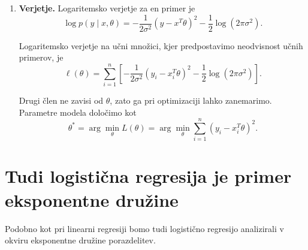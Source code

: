 \begin{enumerate}
\item \textbf{Verjetje.}
Logaritemsko verjetje za en primer je
\[
\log p(y \mid x, \theta) =
-\frac{1}{2\sigma^2}(y - x^T\theta)^2
- \frac{1}{2}\log(2\pi\sigma^2).
\]

Logaritemsko verjetje na učni množici, kjer predpostavimo neodvisnost učnih primerov, je
\[
\ell(\theta)
=
\sum_{i=1}^n
\left[
-\frac{1}{2\sigma^2}(y_i - x_i^T\theta)^2
- \frac{1}{2}\log(2\pi\sigma^2)
\right].
\]

Drugi člen ne zavisi od $\theta$, zato ga pri optimizaciji lahko
zanemarimo. Parametre modela določimo kot
\[
\theta^*
=
\arg\min_\theta L(\theta)
=
\arg\min_\theta
\sum_{i=1}^n (y_i - x_i^T \theta)^2.
\]

\end{enumerate}


\section{Tudi logistična regresija je primer eksponentne družine}

Podobno kot pri linearni regresiji bomo tudi logistično regresijo
analizirali v okviru eksponentne družine porazdelitev.

